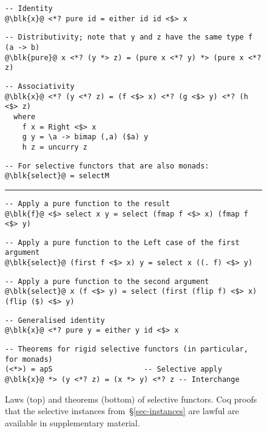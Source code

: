 {\begin{figure}
\begin{verbatim}
-- Identity
@\blk{x}@ <*? pure id = either id id <$> x
\end{verbatim}
\vspace{1mm}
\begin{verbatim}
-- Distributivity; note that y and z have the same type f (a -> b)
@\blk{pure}@ x <*? (y *> z) = (pure x <*? y) *> (pure x <*? z)
\end{verbatim}
\vspace{1mm}
\begin{verbatim}
-- Associativity
@\blk{x}@ <*? (y <*? z) = (f <$> x) <*? (g <$> y) <*? (h <$> z)
  where
    f x = Right <$> x
    g y = \a -> bimap (,a) ($a) y
    h z = uncurry z
\end{verbatim}
\vspace{1mm}
\begin{verbatim}
-- For selective functors that are also monads:
@\blk{select}@ = selectM
\end{verbatim}
\vspace{2mm}
\hrule
\vspace{2mm}
\begin{verbatim}
-- Apply a pure function to the result
@\blk{f}@ <$> select x y = select (fmap f <$> x) (fmap f <$> y)
\end{verbatim}
\vspace{1mm}
\begin{verbatim}
-- Apply a pure function to the Left case of the first argument
@\blk{select}@ (first f <$> x) y = select x ((. f) <$> y)
\end{verbatim}
\vspace{1mm}
\begin{verbatim}
-- Apply a pure function to the second argument
@\blk{select}@ x (f <$> y) = select (first (flip f) <$> x) (flip ($) <$> y)
\end{verbatim}
\vspace{1mm}
\begin{verbatim}
-- Generalised identity
@\blk{x}@ <*? pure y = either y id <$> x
\end{verbatim}
\vspace{1mm}
\begin{verbatim}
-- Theorems for rigid selective functors (in particular, for monads)
(<*>) = apS                     -- Selective apply
@\blk{x}@ *> (y <*? z) = (x *> y) <*? z -- Interchange
\end{verbatim}
\vspace{-1mm}
\caption{Laws (top) and theorems (bottom) of selective functors. Coq proofs that
the selective instances from~\S\ref{sec-instances} are lawful are available in
supplementary material.}
\label{fig-laws}
\vspace{-2mm}
\end{figure}

}
